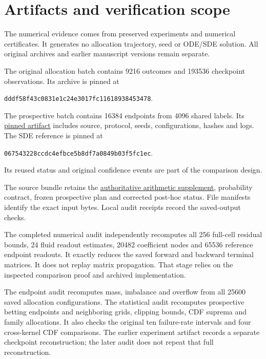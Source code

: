 \section{Artifacts and verification scope}\label{app:artifact}
The numerical evidence comes from preserved experiments and numerical certificates. It generates no allocation trajectory, seed or ODE/SDE solution. All original archives and earlier manuscript versions remain separate.

The original allocation batch contains 9216 outcomes and 193536 checkpoint observations. Its archive is pinned at
\begin{center}\small\texttt{dddf58f43c0831e1c24e3017fc11618938453478}.\end{center}
The prospective batch contains 16384 endpoints from 4096 shared labels. Its \href{https://github.com/19991111/huaweipro-tpht-linux/tree/09480b6e9afcd54574245433df21c1cfac1eede6/research/paper_micro_prospective_20261017}{pinned artifact} includes source, protocol, seeds, configurations, hashes and logs. The SDE reference is pinned at
\begin{center}\small\texttt{067543228ccdc4efbce5b8df7a0849b03f5fc1ec}.\end{center}
Its reused status and original confidence events are part of the comparison design.

The source bundle retains the \href{https://github.com/19991111/huaweipro-tpht-linux/blob/943485ae2be727404deaf50a1dc8c5206782fba2/research/paper_sde_posthoc_erratum_20261017/received/ARITHMETIC_SUPPLEMENT.v2.en.txt}{authoritative arithmetic supplement}, probability contract, frozen prospective plan and corrected post-hoc status. File manifests identify the exact input bytes. Local audit receipts record the saved-output checks.

The completed numerical audit independently recomputes all 256 full-cell residual bounds, 24 fluid readout estimates, 20482 coefficient nodes and 65536 reference endpoint readouts. It exactly reduces the saved forward and backward terminal matrices. It does not replay matrix propagation. That stage relies on the inspected comparison proof and archived implementation.

The endpoint audit recomputes mass, imbalance and overflow from all 25600 saved allocation configurations. The statistical audit recomputes prospective betting endpoints and neighboring grids, clipping bounds, CDF suprema and family allocations. It also checks the original ten failure-rate intervals and four cross-kernel CDF comparisons. The earlier experiment artifact records a separate checkpoint reconstruction; the later audit does not repeat that full reconstruction.

